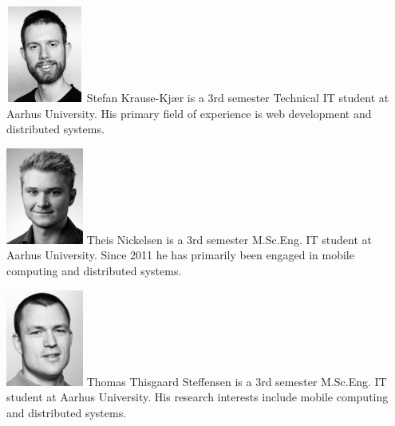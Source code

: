 % 
\vfill\eject

\includegraphics[width=1in,height=1.25in,clip,keepaspectratio]{img/skk.jpg}
{Stefan Krause-Kj\ae r}
is a 3rd semester Technical IT student at Aarhus University. His primary field of experience is web development and distributed systems.

\includegraphics[width=1in,height=1.25in,clip,keepaspectratio]{img/tn.jpg}
{Theis Nickelsen}
is a 3rd semester M.Sc.Eng. IT student at Aarhus University. Since 2011 he has primarily been engaged in mobile computing and distributed systems.


\includegraphics[width=1in,height=1.25in,clip,keepaspectratio]{img/tts.jpg}
{Thomas Thisgaard Steffensen}
is a 3rd semester M.Sc.Eng. IT student at Aarhus University. His research interests include mobile computing and distributed systems.



